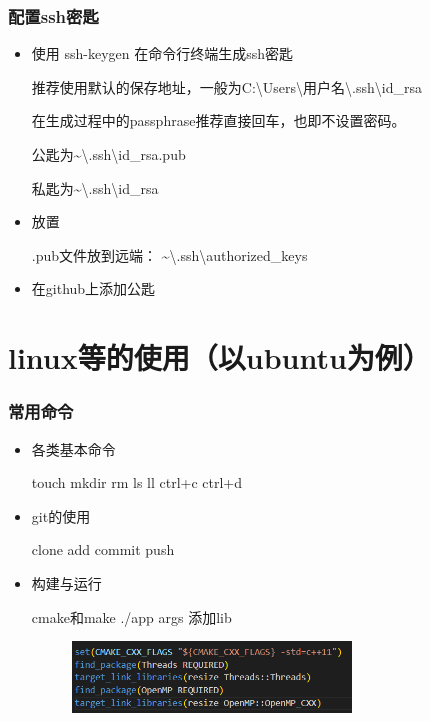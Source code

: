 \documentclass{beamer}
\begin{document}
\begin{frame}
\frametitle{配置ssh密匙}

\begin{itemize}
    \item<1-> 使用 ssh-keygen 在命令行终端生成ssh密匙
    
    推荐使用默认的保存地址，一般为C:\textbackslash Users\textbackslash 用户名\textbackslash.ssh\textbackslash id\_rsa
    
    在生成过程中的passphrase推荐直接回车，也即不设置密码。
    
    公匙为\textasciitilde\textbackslash.ssh\textbackslash id\_rsa.pub
    
    私匙为\textasciitilde\textbackslash.ssh\textbackslash id\_rsa
    
    \item<2-> 放置
    
    .pub文件放到远端：
    \textasciitilde\textbackslash.ssh\textbackslash authorized\_keys
    \item<3-> 在github上添加公匙
\end{itemize}

\end{frame}


\section{linux等的使用（以ubuntu为例）}

\begin{frame}
\frametitle{常用命令}

\begin{itemize}
    \item<1-> 各类基本命令
    
    touch mkdir rm ls ll ctrl+c ctrl+d
    \item<2-> git的使用
    
    clone
    add
    commit 
    push 
    
    \item<3-> 构建与运行
    
    cmake和make
    ./app args
    添加lib
    \begin{figure}[H] %
    	\centering %
    	\includegraphics[width=0.7\textwidth]{p2.png} %
    	\label{p2} %
    \end{figure}
    
    
\end{itemize}
\end{frame}
\end{document}
